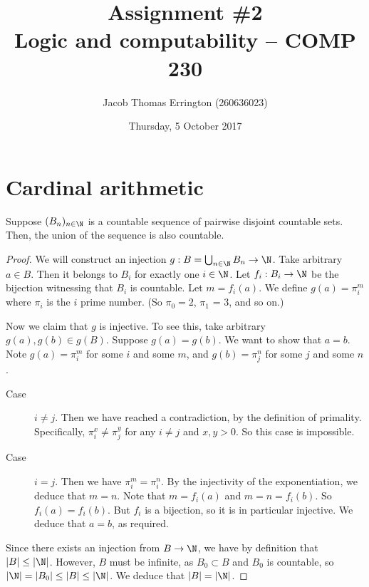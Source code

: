 \documentclass[11pt,letterpaper]{article}
\author{Jacob Thomas Errington (260636023)}
\title{Assignment \#2\\Logic and computability -- COMP 230}
\date{Thursday, 5 October 2017}
\begin{document}
\maketitle

\section{Cardinal arithmetic}

\begin{prop}
  Suppose $(B_n)_{n\in\N}$ is a countable sequence of pairwise disjoint
  countable sets.
  Then, the union of the sequence is also countable.
\end{prop}

\begin{proof}
  We will construct an injection $g : B = \Union_{n\in\N} B_n \to \N$.
  Take arbitrary $a \in B$.
  Then it belongs to $B_i$ for exactly one $i \in \N$.
  Let $f_i : B_i \to \N$ be the bijection witnessing that $B_i$ is countable.
  Let $m = f_i(a)$.
  We define $g(a) = \pi_i^m$ where $\pi_i$ is the $i$\th{} prime number.
  (So $\pi_0 = 2$, $\pi_1$ = 3, and so on.)

  Now we claim that $g$ is injective.
  To see this, take arbitrary $g(a), g(b) \in g(B)$.
  Suppose $g(a) = g(b)$.
  We want to show that $a = b$.
  Note $g(a) = \pi_i^m$ for some $i$ and some $m$,
  and $g(b) = \pi_j^n$ for some $j$ and some $n$.
  \begin{description}
    \item[Case] $i \neq j$.
      Then we have reached a contradiction, by the definition of primality.
      Specifically, $\pi_i^x \neq \pi_j^y$ for any $i \neq j$ and $x, y > 0$.
      So this case is impossible.

    \item[Case] $i = j$.
      Then we have $\pi_i^m = \pi_i^n$.
      By the injectivity of the exponentiation, we deduce that $m = n$.
      Note that $m = f_i(a)$ and $m = n = f_i(b)$.
      So $f_i(a) = f_i(b)$.
      But $f_i$ is a bijection, so it is in particular injective.
      We deduce that $a = b$, as required.
  \end{description}

  Since there exists an injection from $B \to \N$,
  we have by definition that $|B| \leq |\N|$.
  However, $B$ must be infinite, as $B_0 \subset B$ and $B_0$ is countable,
  so $|\N| = |B_0| \leq |B| \leq |\N|$.
  We deduce that $|B| = |\N|$.
\end{proof}
\end{document}
